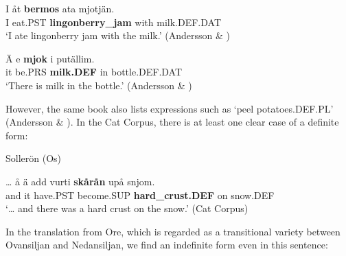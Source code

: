 \ea\label{}
\gll I  åt  \textbf{bermos} ata  mjotjän.\\


I  eat.PST  \textbf{lingonberry\_jam} with  milk.DEF.DAT\\

\glt ‘I ate lingonberry jam with the milk.’ (Andersson \& \citet[373]{Danielsson1999})

\z

\item 


 \ea\label{}
\gll Ä  e  \textbf{mjok} i  putällim.\\


it  be.PRS  \textbf{milk.DEF} in  bottle.DEF.DAT\\

\glt ‘There is milk in the bottle.’ (Andersson \& \citet[373]{Danielsson1999})

\z

However, the same book also lists expressions such as  ‘peel potatoes.DEF.PL’ (Andersson \& \citet[176]{Danielsson1999}). In the Cat Corpus, there is at least one clear case of a definite form:


\item 

Sollerön (Os) 



 \ea\label{}
\gll …  å  ä  add  vurti  \textbf{skårån} upå  snjom.\\


  and  it  have.PST  become.SUP  \textbf{hard\_crust.DEF} on  snow.DEF\\

\glt ‘… and there was a hard crust on the snow.’ (Cat Corpus)

\z

In the translation from Ore, which is regarded as a transitional variety between Ovansiljan and Nedansiljan, we find an indefinite form even in this sentence:

